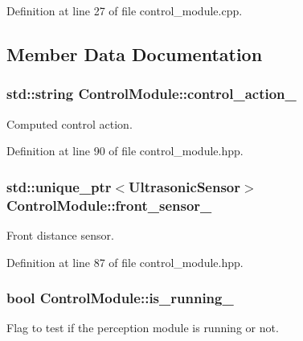 Definition at line 27 of file control\+\_\+module.\+cpp.



\subsection{Member Data Documentation}
\subsubsection[{\texorpdfstring{control\+\_\+action\+\_\+}{control_action_}}]{\setlength{\rightskip}{0pt plus 5cm}std\+::string Control\+Module\+::control\+\_\+action\+\_\+\hspace{0.3cm}{\ttfamily [private]}}\hypertarget{class_control_module_acf268f1e0e9d27bff61e89c681a739a3}{}\label{class_control_module_acf268f1e0e9d27bff61e89c681a739a3}


Computed control action. 



Definition at line 90 of file control\+\_\+module.\+hpp.

\subsubsection[{\texorpdfstring{front\+\_\+sensor\+\_\+}{front_sensor_}}]{\setlength{\rightskip}{0pt plus 5cm}std\+::unique\+\_\+ptr$<${\bf Ultrasonic\+Sensor}$>$ Control\+Module\+::front\+\_\+sensor\+\_\+\hspace{0.3cm}{\ttfamily [private]}}\hypertarget{class_control_module_ad446c4323ea97a807a9b355c2f121a20}{}\label{class_control_module_ad446c4323ea97a807a9b355c2f121a20}


Front distance sensor. 



Definition at line 87 of file control\+\_\+module.\+hpp.

\subsubsection[{\texorpdfstring{is\+\_\+running\+\_\+}{is_running_}}]{\setlength{\rightskip}{0pt plus 5cm}bool Control\+Module\+::is\+\_\+running\+\_\+\hspace{0.3cm}{\ttfamily [private]}}\hypertarget{class_control_module_af48419a814c008e4695bef60daf2a516}{}\label{class_control_module_af48419a814c008e4695bef60daf2a516}
Flag to test if the perception module is running or not. 

